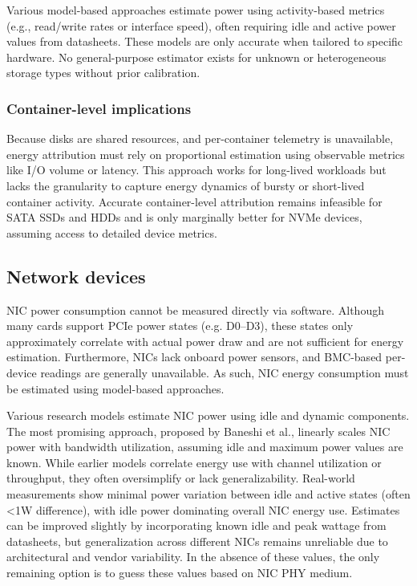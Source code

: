 Various model-based approaches estimate power using activity-based metrics (e.g., read/write rates or interface speed), often requiring idle and active power values from datasheets. These models are only accurate when tailored to specific hardware. No general-purpose estimator exists for unknown or heterogeneous storage types without prior calibration.

\subsubsection{Container-level implications}
Because disks are shared resources, and per-container telemetry is unavailable, energy attribution must rely on proportional estimation using observable metrics like I/O volume or latency. This approach works for long-lived workloads but lacks the granularity to capture energy dynamics of bursty or short-lived container activity. Accurate container-level attribution remains infeasible for SATA SSDs and HDDs and is only marginally better for NVMe devices, assuming access to detailed device metrics.

\subsection{Network devices}

NIC power consumption cannot be measured directly via software. Although many cards support PCIe power states (e.g. D0–D3), these states only approximately correlate with actual power draw and are not sufficient for energy estimation. Furthermore, NICs lack onboard power sensors, and BMC-based per-device readings are generally unavailable. As such, NIC energy consumption must be estimated using model-based approaches.

Various research models estimate NIC power using idle and dynamic components. The most promising approach, proposed by Baneshi et al., linearly scales NIC power with bandwidth utilization, assuming idle and maximum power values are known. While earlier models correlate energy use with channel utilization or throughput, they often oversimplify or lack generalizability. Real-world measurements show minimal power variation between idle and active states (often \textless1W difference), with idle power dominating overall NIC energy use. Estimates can be improved slightly by incorporating known idle and peak wattage from datasheets, but generalization across different NICs remains unreliable due to architectural and vendor variability. In the absence of these values, the only remaining option is to guess these values based on NIC PHY medium.


